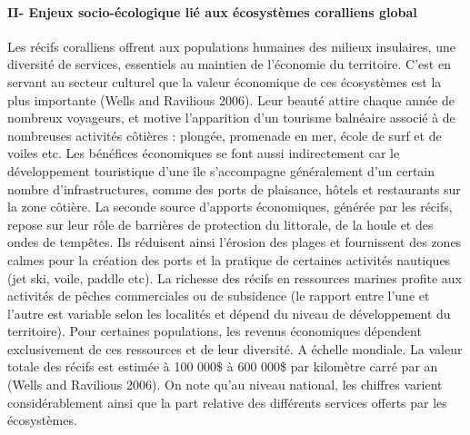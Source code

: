 \documentclass[]{article}
\let\oldparagraph\paragraph
\renewcommand{\paragraph}[1]{\oldparagraph{#1}\mbox{}}
\begin{document}
\hypertarget{ii--enjeux-socio-uxe9cologique-liuxe9-aux-uxe9cosystuxe8mes-coralliens-global}{%
\paragraph{II- Enjeux socio-écologique lié aux écosystèmes coralliens
global
}\label{ii--enjeux-socio-uxe9cologique-liuxe9-aux-uxe9cosystuxe8mes-coralliens-global}}

Les récifs coralliens offrent aux populations humaines des milieux
insulaires, une diversité de services, essentiels au maintien de
l'économie du territoire. C'est en servant au secteur culturel que la
valeur économique de ces écosystèmes est la plus importante (Wells and
Ravilious 2006). Leur beauté attire chaque année de nombreux voyageurs,
et motive l'apparition d'un tourisme balnéaire associé à de nombreuses
activités côtières : plongée, promenade en mer, école de surf et de
voiles etc. Les bénéfices économiques se font aussi indirectement car le
développement touristique d'une île s'accompagne généralement d'un
certain nombre d'infrastructures, comme des ports de plaisance, hôtels
et restaurants sur la zone côtière. La seconde source d'apports
économiques, générée par les récifs, repose sur leur rôle de barrières
de protection du littorale, de la houle et des ondes de tempêtes. Ils
réduisent ainsi l'érosion des plages et fournissent des zones calmes
pour la création des ports et la pratique de certaines activités
nautiques (jet ski, voile, paddle etc). La richesse des récifs en
ressources marines profite aux activités de pêches commerciales ou de
subsidence (le rapport entre l'une et l'autre est variable selon les
localités et dépend du niveau de développement du territoire). Pour
certaines populations, les revenus économiques dépendent exclusivement
de ces ressources et de leur diversité. A échelle mondiale. La valeur
totale des récifs est estimée à 100 000\$ à 600 000\$ par kilomètre
carré par an (Wells and Ravilious 2006). On note qu'au niveau national,
les chiffres varient considérablement ainsi que la part relative des
différents services offerts par les écosystèmes.
\end{document}
